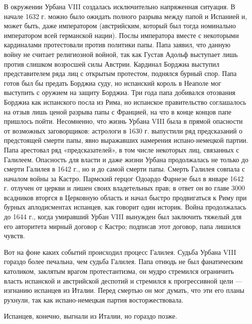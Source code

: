 В окружении Урбана VIII  создалась исключительно напряженная ситуация.
В начале  1632 г.  можно было  ожидать полного  разрыва между  папой и
Испанией  и, может  быть, даже  императором (австрийским,  который был
тогда номинально императором всей  германской нации). Послы императора
вместе  с некоторыми  кардиналами протестовали  против политики  папы.
Папа  заявил, что  данную  войну не  считает  религиозной войной,  так
как  Густав  Адольф  выступает  лишь  против  слишком  возросшей  силы
Австрии. Кардинал Борджиа выступил  представителем ряда лиц с открытым
протестом, поднялся  бурный спор.  Папа готов  был бы  предать Борджиа
суду, но испанский король в Неаполе  мог выступить с оружием на защиту
Борджиа.  Три года  папа  добивался отозвания  Борджиа как  испанского
посла из  Рима, но испанское  правительство соглашалось на  отзыв лишь
ценой разрыва  папы с Францией,  на что  в конце концов  папе пришлось
пойти. Несомненно,  что жизнь Урбана  VIII была в прямой  опасности от
возможных заговорщиков: астрологи в 1630 г. выпустили ряд предсказаний
о предстоящей  смерти папы, явно выражавших  намерения испано-немецкой
партии.  Папа арестовал  ряд «предсказателей»,  в том  числе некоторых
лиц, связанных  с Галилеем. Опасность  для власти и даже  жизни Урбана
продолжалась не  только до  смерти Галилея  в 1642 г.,  но и  до самой
смерти  папы.  Смерть  Галилея  совпала с  началом  войны  за  Кастро.
Пармский герцог Одоардо Фарнезе был в январе 1642 г. отлучен от церкви
и лишен  своих владетельных прав; в  ответ он во главе  3000 всадников
вторгся  в  Церковную  область  и начал  быстро  продвигаться  к  Риму
при  бурных аплодисментах  испанцев, как  говорит один  историк. Война
продолжалась  до 1644  г.,  когда умиравший  Урбан  VIII вынужден  был
заключить тяжелый для его авторитета мирный договор с Кастро; подписав
этот договор, папа лишился чувств.

Вот на  фоне каких событий  происходил процесс Галилея.  Судьба Урбана
VIII гораздо  более печальна, чем  судьба Галилея. Папа отнюдь  не был
фанатическим  католиком,  заклятым  врагом  протестантизма,  он  мудро
стремился  ограничить  власть  испанской   и  австрийской  деспотий  и
стремился  к  прогрессивной  цели  --- изгнанию  испанцев  из  Италии.
Перед  смертью он  мог  думать, что  эти его  планы  рухнули, так  как
испано-немецкая партия восторжествовала.

Испанцев, конечно, выгнали из Италии, но гораздо позже.

